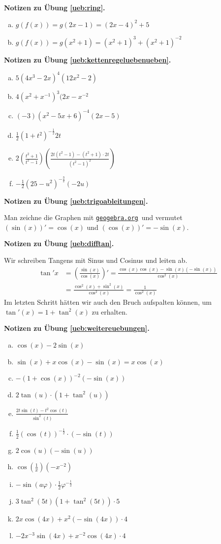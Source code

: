 \documentclass[%
11pt,%
twoside,%
titlepage,%
german,%
headsepline%
]{scrartcl}
\newcommand{\geogebralink}{\href{https://www.geogebra.org/calculator}{\texttt{geogebra.org}}}
\theoremstyle{definition}
\theoremstyle{plain}
\newcommand{\concatueb}[1]{ueb:#1}%
\newcommand{\concatlsg}[1]{lsg:#1}%
\newenvironment{lsg}[1]{%
    \par\noindent\textbf{Notizen zu Übung \ref{\concatueb{#1}}.}%
    \label{\concatlsg{#1}}
}{%
    \par%
}
\begin{document}
\begin{lsg}{ring}
    \begin{enumerate}[a)]
        \item $g(f(x))=g(2x-1)=(2x-4)^2+5$
        \item $g(f(x))=g(x^2+1)=(x^2+1)^3+(x^2+1)^{-2}$
    \end{enumerate}
\end{lsg}
\begin{lsg}{kettenregeluebenueben}
    \begin{enumerate}[a)]
        \item $5(4x^3-2x)^4(12x^2-2)$
        \item $4(x^2+x^{-1})^3(2x-x^{-2}$
        \item $(-3)(x^2-5x+6)^{-4}(2x-5)$
        \item $\frac{1}{2}(1+t^2)^{-\frac{1}{2}}2t$
        \item $2\left(\frac{t^2+1}{t^2-1}\right)\left(\frac{2t(t^2-1)-(t^2+1)\cdot2t}{(t^2-1)^2}\right)$
        \item $-\frac{1}{2}(25-u^2)^{-\frac{3}{2}}(-2u)$
    \end{enumerate}
\end{lsg}
\begin{lsg}{trigoableitungen}
    Man zeichne die Graphen mit \geogebralink\ und vermutet $(\sin(x))'=\cos(x)$ und $(\cos(x))'=-\sin(x)$.
\end{lsg}
\begin{lsg}{difftan}
    Wir schreiben Tangens mit Sinus und Cosinus und leiten ab.
    \begin{align*}
        \tan'{x} &= \left(\frac{\sin(x)}{\cos(x)}\right)'=\frac{\cos(x)\cos(x)-\sin(x)(-\sin(x))}{\cos^2(x)}\\
        &= \frac{\cos^2(x)+\sin^2(x)}{\cos^2(x)} = \frac{1}{\cos^2(x)}
    \end{align*}
    Im letzten Schritt hätten wir auch den Bruch aufspalten können, um $\tan'(x)=1+\tan^2(x)$ zu erhalten.
\end{lsg}
\begin{lsg}{weitereuebungen}
\begin{enumerate}[a)]
        \item $\cos(x)-2\sin(x)$
        \item $\sin(x)+x\cos(x)-\sin(x)=x\cos(x)$
        \item $-(1+\cos(x))^{-2}(-\sin(x))$
        \item $2\tan(u)\cdot(1+\tan^2(u))$
        \item $\frac{2t\sin(t)-t^2\cos(t)}{\sin^2(t)}$
        \item $\frac{1}{2}(\cos(t))^{-\frac{1}{2}}\cdot(-\sin(t))$
        \item $2\cos(u)(-\sin(u))$
        \item $\cos(\frac{1}{x})(-x^{-2})$
        \item $-\sin(a\varphi)\cdot\frac{1}{2}\varphi^{-\frac{1}{2}}$
        \item $3\tan^2(5t)(1+\tan^2(5t))\cdot5$
        \item $2x\cos(4x)+x^2(-\sin(4x))\cdot4$
        \item $-2x^{-3}\sin(4x)+x^{-2}\cos(4x)\cdot4$
\end{enumerate}
\end{lsg}
\end{document}
